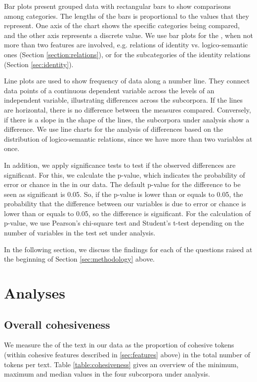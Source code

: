 \documentclass[output=paper]{langsci/langscibook.cls}
\begin{document}
Bar plots present grouped data with rectangular bars to show comparisons among categories. The lengths of the bars is proportional to the values that they represent. One axis of the chart shows the specific categories being compared, and the other axis represents a discrete value. We use bar plots for the , when not more than two features are involved, e.g. relations of identity vs. logico-semantic ones (Section \ref{section:relations}), or for the subcategories of the identity relations (Section \ref{sec:identity}).

Line plots are used to show frequency of data along a number line. They connect data points of a continuous dependent variable across the levels of an independent variable, illustrating differences across the subcorpora. If the lines are horizontal, there is no difference between the measures compared. Conversely, if there is a slope in the shape of the lines, the subcorpora under analysis show a difference. We use line charts for the analysis of differences based on the distribution of logico-semantic relations, since we have more than two variables at once.

In addition, we apply significance tests to test if the observed differences are significant. For this, we calculate the {\sc p-value}, which indicates the probability of error or chance in the  in our data. The default p-value for the difference to be seen as significant is 0.05. So, if the p-value is lower than or equals to 0.05, the probability that the difference between our variables is due to error or chance is lower than or equals to 0.05, so the difference is significant. For the calculation of p-value, we use Pearson's chi-square test and Student's t-test \citep{Baayen2008} depending on the number of variables in the test set under analysis.

In the following section, we discuss the findings for each of the questions raised at the beginning of Section \ref{sec:methodology} above.

\section{Analyses}\label{sec:analyses}

\subsection{Overall cohesiveness}\label{sec:cohesiveness}

We measure the  of the text in our data as the proportion of cohesive tokens (within cohesive features described in \ref{sec:features} above) in the total number of tokens per text. Table \ref{table:cohesiveness} gives an overview of the minimum, maximum and median values in the four subcorpora under analysis. 
\end{document}

